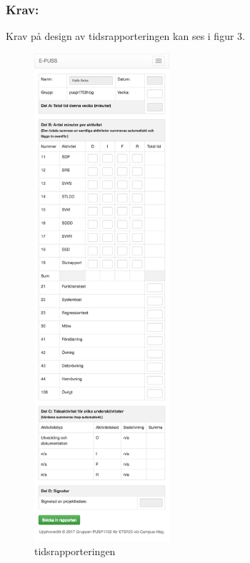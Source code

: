 \documentclass[paper=a4, fontsize=11pt,twoside]{article}
\begin{document}
\subsubsection{Krav:} Krav på design av tidsrapporteringen kan ses i figur 3.
\begin{figure}[H]
\centering
\includegraphics[width=5cm]{prtscn-tidrapportering.png}
\caption{tidsrapporteringen}
\end{figure}
\end{document}
